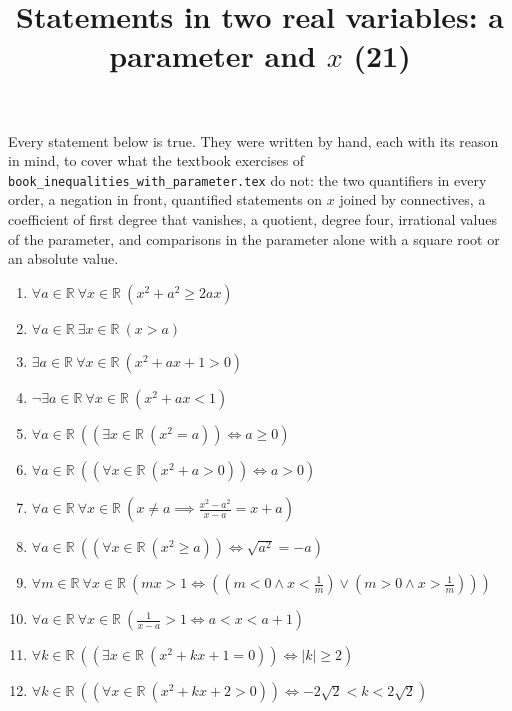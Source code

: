 \documentclass[11pt,a4paper]{article}
\title{Statements in two real variables: a parameter and $x$ (21)}
\author{}
\date{}
\begin{document}
\maketitle
Every statement below is true. They were written by hand, each with its reason in mind, to cover what the textbook exercises of \texttt{book\_inequalities\_with\_parameter.tex} do not: the two quantifiers in every order, a negation in front, quantified statements on $x$ joined by connectives, a coefficient of first degree that vanishes, a quotient, degree four, irrational values of the parameter, and comparisons in the parameter alone with a square root or an absolute value.

\begin{enumerate}
\item $\displaystyle \forall a \in \mathbb{R}\ \forall x \in \mathbb{R}\ (x^{2} + a^{2} \ge 2ax)$
\item $\displaystyle \forall a \in \mathbb{R}\ \exists x \in \mathbb{R}\ (x > a)$
\item $\displaystyle \exists a \in \mathbb{R}\ \forall x \in \mathbb{R}\ (x^{2} + ax + 1 > 0)$
\item $\displaystyle \lnot \exists a \in \mathbb{R}\ \forall x \in \mathbb{R}\ (x^{2} + ax < 1)$
\item $\displaystyle \forall a \in \mathbb{R}\ \left( \left(\exists x \in \mathbb{R}\ (x^{2} = a)\right) \iff a \ge 0 \right)$
\item $\displaystyle \forall a \in \mathbb{R}\ \left( \left(\forall x \in \mathbb{R}\ (x^{2} + a > 0)\right) \iff a > 0 \right)$
\item $\displaystyle \forall a \in \mathbb{R}\ \forall x \in \mathbb{R}\ \left(x \neq a \implies \frac{x^{2} - a^{2}}{x - a} = x + a\right)$
\item $\displaystyle \forall a \in \mathbb{R}\ \left( \left(\forall x \in \mathbb{R}\ (x^{2} \ge a)\right) \iff \sqrt{a^{2}} = -a \right)$
\item $\displaystyle \forall m \in \mathbb{R}\ \forall x \in \mathbb{R}\ \left( mx > 1 \iff \left( (m < 0 \land x < \frac{1}{m}) \lor (m > 0 \land x > \frac{1}{m}) \right) \right)$
\item $\displaystyle \forall a \in \mathbb{R}\ \forall x \in \mathbb{R}\ \left( \frac{1}{x - a} > 1 \iff a < x < a + 1 \right)$
\item $\displaystyle \forall k \in \mathbb{R}\ \left( \left(\exists x \in \mathbb{R}\ (x^{2} + kx + 1 = 0)\right) \iff \left|k\right| \ge 2 \right)$
\item $\displaystyle \forall k \in \mathbb{R}\ \left( \left(\forall x \in \mathbb{R}\ (x^{2} + kx + 2 > 0)\right) \iff -2\sqrt{2} < k < 2\sqrt{2} \right)$

\end{enumerate}
\end{document}
